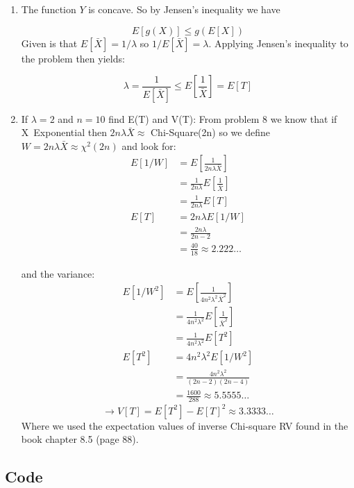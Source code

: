 \documentclass{article}
\newcommand{\1}{\mathbf{1}}
\begin{document}
\begin{enumerate}
    \item The function $Y$ is concave. So by Jensen's inequality we have
    
    $$E[g(X)] \leq g\left( E[X] \right)$$
    Given is that $E[\bar X] = 1/\lambda$ so $1/E[\bar X] = \lambda$. Applying Jensen's inequality to the problem then yields:
    
    $$\lambda = \frac{1}{E[\bar X]} \leq E\left[\frac{1}{\bar X}\right] = E[T]$$
    
    \item If $\lambda =2$ and $n=10$ find E(T) and V(T):
    From problem 8 we know that if X~Exponential then $2n\lambda\bar X \approx$ Chi-Square(2n) so we define $W=2n\lambda\bar X \approx \chi^2(2n)$ and look for:
    \begin{align*}
        E[1/W] &= E\left[ \frac{1}{2n\lambda\bar X} \right] \\
        &= \frac{1}{2n\lambda} E\left[ \frac{1}{\bar X} \right] \\
        &= \frac{1}{2n\lambda} E[T] \\
        E[T] &= 2n\lambda E[1/W] \\
        &= \frac{2n\lambda}{2n -2} \\
        &= \frac{40}{18} \approx 2.222\hdots
    \end{align*}
    
    and the variance:
    \begin{align*}
        E[1/W^2] &= E\left[ \frac{1}{4n^2\lambda^2\bar X^2} \right] \\
        &= \frac{1}{4n^2\lambda^2} E\left[ \frac{1}{\bar X^2} \right] \\
        &= \frac{1}{4n^2\lambda^2} E[T^2] \\
        E[T^2] &= 4n^2\lambda^2 E[1/W^2] \\
        &= \frac{4n^2\lambda^2}{(2n -2)(2n-4)} \\
        &= \frac{1600}{288} \approx 5.5555\hdots
    \end{align*}
    $$\rightarrow V[T] = E[T^2] - E[T]^2 \approx 3.3333\hdots$$
    Where we used the expectation values of inverse Chi-square RV found in the book chapter 8.5 (page 88). 
\end{enumerate}


\newpage
\subsection*{Code}


\end{document}
